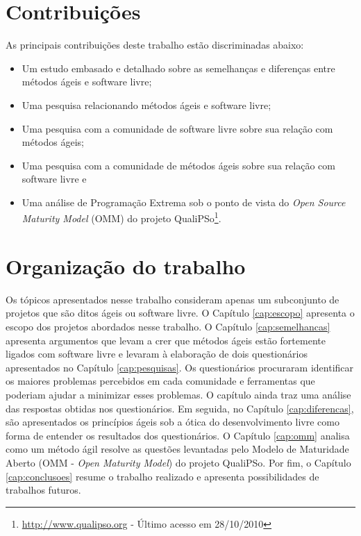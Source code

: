 \section{Contribuições}
\label{sec:contribucoes}

As principais contribuições deste trabalho estão discriminadas abaixo:

\begin{itemize}
\item Um estudo embasado e detalhado sobre as semelhanças e diferenças
  entre métodos ágeis e software livre;
\item Uma pesquisa relacionando métodos ágeis e software livre;
\item Uma pesquisa com a comunidade de software livre sobre sua
  relação com métodos ágeis;
\item Uma pesquisa com a comunidade de métodos ágeis sobre sua relação
  com software livre e
\item Uma análise de Programação Extrema \cite{XP01} sob o ponto de
  vista do \emph{Open Source Maturity Model} (OMM) do projeto
  QualiPSo\footnote{\url{http://www.qualipso.org} - Último acesso em
    28/10/2010}.
\end{itemize}

\section{Organização do trabalho}
\label{sec:organizacao_trabalho}

Os tópicos apresentados nesse trabalho consideram apenas um
subconjunto de projetos que são ditos ágeis ou software livre. O
Capítulo \ref{cap:escopo} apresenta o escopo dos projetos abordados
nesse trabalho. O Capítulo \ref{cap:semelhancas} apresenta argumentos
que levam a crer que métodos ágeis estão fortemente ligados com
software livre e levaram à elaboração de dois questionários
apresentados no Capítulo \ref{cap:pesquisas}. Os questionários
procuraram identificar os maiores problemas percebidos em cada
comunidade e ferramentas que poderiam ajudar a minimizar esses
problemas. O capítulo ainda traz uma análise das respostas obtidas nos
questionários.  Em seguida, no Capítulo \ref{cap:diferencas}, são
apresentados os princípios ágeis sob a ótica do desenvolvimento livre
como forma de entender os resultados dos questionários. O Capítulo
\ref{cap:omm} analisa como um método ágil resolve as questões
levantadas pelo Modelo de Maturidade Aberto (OMM - {\it Open Maturity
  Model}) do projeto QualiPSo.  Por fim, o Capítulo
\ref{cap:conclusoes} resume o trabalho realizado e apresenta
possibilidades de trabalhos futuros.
